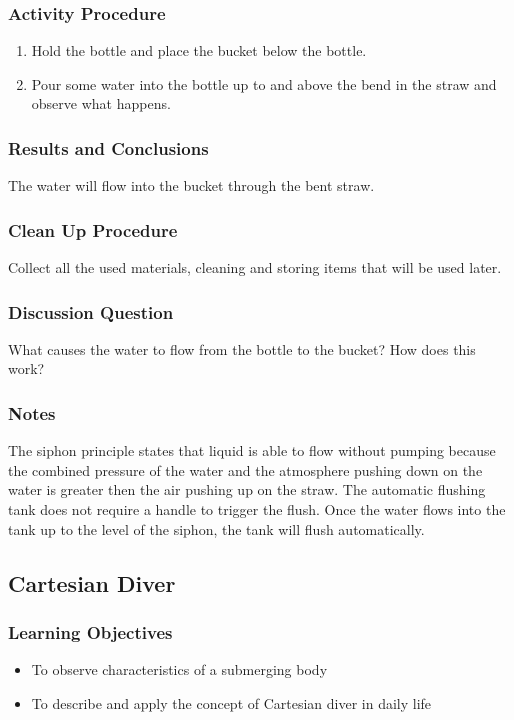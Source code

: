 \subsubsection*{Activity Procedure}
\begin{enumerate}
\item{Hold the bottle and place the bucket below the bottle.} 
\item{Pour some water into the bottle up to and above the bend in the straw and observe what happens.} 
\end{enumerate}

\subsubsection*{Results and Conclusions}
The water will flow into the bucket through the bent straw. 

\subsubsection*{Clean Up Procedure}
Collect all the used materials, cleaning and storing items that will be used later.

\subsubsection*{Discussion Question}
What causes the water to flow from the bottle to the bucket? How does this work?

\subsubsection*{Notes}
The siphon principle states that liquid is able to flow without pumping because the combined pressure of the water and the atmosphere pushing down on the water is greater then the air pushing up on the straw. The automatic flushing tank does not require a handle to trigger the flush. Once the water flows into the tank up to the level of the siphon, the tank will flush automatically. 


\subsection{Cartesian Diver}

\subsubsection*{Learning Objectives}
\begin{itemize}
\item{To observe characteristics of a submerging body}
\item{To describe and apply the concept of Cartesian diver in daily life}
\end{itemize}

